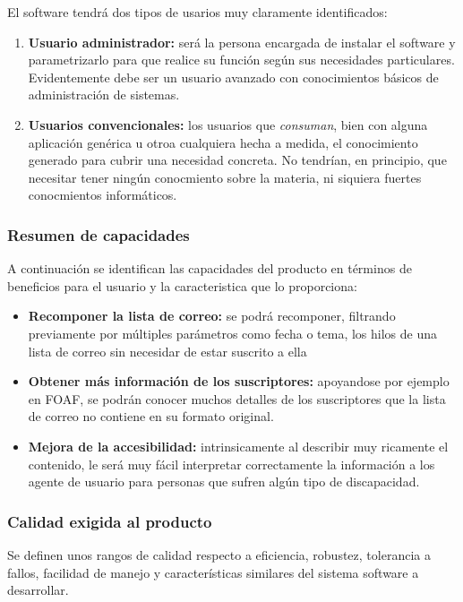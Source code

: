 El software tendrá dos tipos de usarios muy claramente identificados:

\begin{enumerate}
  \item \textbf{Usuario administrador:} será la persona encargada de
	instalar el software y parametrizarlo para que realice su
	función según sus necesidades particulares. Evidentemente debe
	ser un usuario avanzado con conocimientos básicos de administración
	de sistemas.
  \item \textbf{Usuarios convencionales:} los usuarios que \emph{consuman},
	bien con alguna aplicación genérica u otroa cualquiera hecha a medida,
	el conocimiento generado para cubrir una necesidad concreta. No
	tendrían, en principio, que necesitar tener ningún conocmiento 
	sobre la materia, ni siquiera fuertes conocmientos informáticos.
\end{enumerate}

\subsubsection{Resumen de capacidades}

A continuación se identifican las capacidades del producto en términos de 
beneficios para el usuario y la caracteristica que lo proporciona:

\begin{itemize}
  \item \textbf{Recomponer la lista de correo:} se podrá recomponer, filtrando 
	previamente por múltiples parámetros como fecha o tema, los hilos de una 
	lista de correo sin necesidar de estar suscrito a ella
  \item \textbf{Obtener más información de los suscriptores:} apoyandose por 
	ejemplo en FOAF, se podrán conocer muchos detalles de los suscriptores 
	que la lista de correo no contiene en su formato original.
  \item \textbf{Mejora de la accesibilidad:} intrinsicamente al describir muy 
	ricamente el contenido, le será muy fácil interpretar correctamente 
	la información a los agente de usuario para personas que sufren algún 
	tipo de discapacidad.
\end{itemize}

\subsubsection{Calidad exigida al producto}

Se definen unos rangos de calidad respecto a eficiencia, robustez, 
tolerancia a fallos, facilidad de manejo y características similares 
del sistema software a desarrollar.

